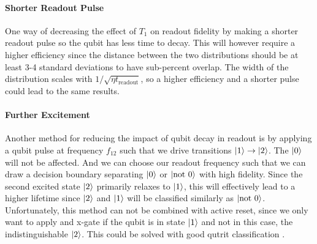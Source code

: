 \paragraph{Shorter Readout Pulse} One way of decreasing the effect of $T_1$ on readout fidelity by making a shorter readout pulse so the qubit has less time to decay. This will however require a higher efficiency since the distance between the two distributions should be at least 3-4 standard deviations to have sub-percent overlap. The width of the distribution scales with $1 / \sqrt{\eta t_{\text{readout}}}$, so a higher efficiency and a shorter pulse could lead to the same results.

\paragraph{Further Excitement} Another method for reducing the impact of qubit decay in readout is by applying a qubit pulse at frequency $f_{12}$ such that we drive transitions $\ket{1}\to\ket{2}$. The $\ket{0}$ will not be affected. And we can choose our readout frequency such that we can draw a decision boundary separating $\ket{0}$ or $\ket{\text{not }0}$ with high fidelity. Since the second excited state $\ket{2}$ primarily relaxes to $\ket{1}$, this will effectively lead to a higher lifetime since $\ket{2}$ and $\ket{1}$ will be classified similarly as $\ket{\text{not } 0}$. Unfortunately, this method can not be combined with active reset, since we only want to apply and x-gate if the qubit is in state $\ket{1}$ and not in this case, the indistinguishable $\ket{2}$. This could be solved with good qutrit classification \cite{chen_transmon_reaout}.



